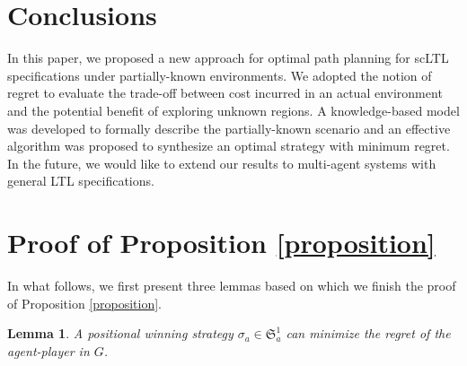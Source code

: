 \documentclass{ifacconf}
\newtheorem{lemma}{Lemma}
\def \S{\mathfrak{S}}
\begin{document}
\section{Conclusions}\label{sec:conclu}
In this paper, we proposed a new approach for optimal path planning for scLTL specifications under partially-known environments. We adopted the notion of regret to evaluate the trade-off between cost incurred in an actual environment and the potential benefit of exploring unknown regions. A   knowledge-based model was developed to formally describe the partially-known scenario and an effective algorithm was proposed to synthesize an optimal strategy with minimum regret.  In the future, we would like to extend our results to multi-agent systems with general LTL specifications.   





\newpage
\appendix
\section{Proof of Proposition \ref{proposition}}\label{apdx:pf-proposition}

In what follows, we first present three lemmas based on which we finish the proof of Proposition \ref{proposition}.

\begin{lemma}\label{lem-positional}
A \emph{positional} winning strategy $\sigma_a\!\in\!\S_a^1$ can minimize the regret of the agent-player in $G$.
\end{lemma}
\end{document}
